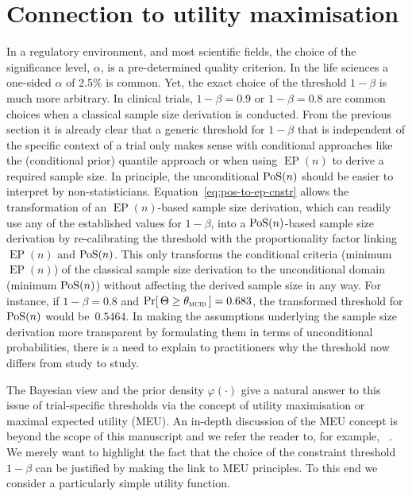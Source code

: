 \documentclass{article}
\renewcommand{\Pr}{\operatorname{Pr}}
\newcommand{\EP}{\operatorname{EP}}
\begin{document}
\section{Connection to utility maximisation}
\label{sec:utility}

In a regulatory environment, and most scientific fields,
the choice of the significance level, $\alpha$, is a pre-determined
quality criterion.
In the life sciences a one-sided $\alpha$ of 2.5\% is common.
Yet, the exact choice of the threshold $1-\beta$ is much more arbitrary.
In clinical trials, $1-\beta=0.9$ or $1-\beta=0.8$ are common choices when
a classical sample size derivation is conducted.
From the previous section it is already clear that a
generic threshold for $1-\beta$ that is independent of the specific context of a trial only makes sense with conditional approaches like the (conditional prior) quantile approach or when using $\EP(n)$ to derive a required sample size.
In principle, the unconditional $\operatorname{PoS}(n)$ should be easier to interpret
by non-statisticians.
Equation~\eqref{eq:pos-to-ep-cnstr} allows the transformation of an $\EP(n)$-based
sample size derivation, which can readily use any of the established values for $1-\beta$, into a $\operatorname{PoS}(n)$-based sample size derivation by
re-calibrating the threshold with the proportionality factor linking $\EP(n)$ and $\operatorname{PoS}(n)$.
This only transforms the conditional criteria (minimum $\EP(n)$)
of the classical sample size derivation to the unconditional domain (minimum $\operatorname{PoS}(n)$) without affecting the derived sample size in any way.
For instance, if $1-\beta=0.8$ and $\Pr[\,\Theta\geq\mcid\,] = 0.683$,
the transformed threshold for $\operatorname{PoS}(n)$ would be~$0.5464$.
In making the assumptions underlying the sample size derivation more transparent by formulating them in terms of unconditional probabilities, there is a need to explain to practitioners why the threshold
now differs from study to study.

The Bayesian view and the prior density $\varphi(\cdot)$ give a natural
answer to this issue of trial-specific thresholds via
the concept of utility maximisation or maximal expected utility (MEU).
An in-depth discussion of the MEU concept is beyond the scope of
this manuscript and we refer the reader to, for example, ~\citet{lindley-1997}.
We merely want to highlight the fact that the choice of the constraint threshold $1-\beta$ can be justified by making the link to MEU principles.
To this end we consider a particularly simple utility function.
\end{document}
